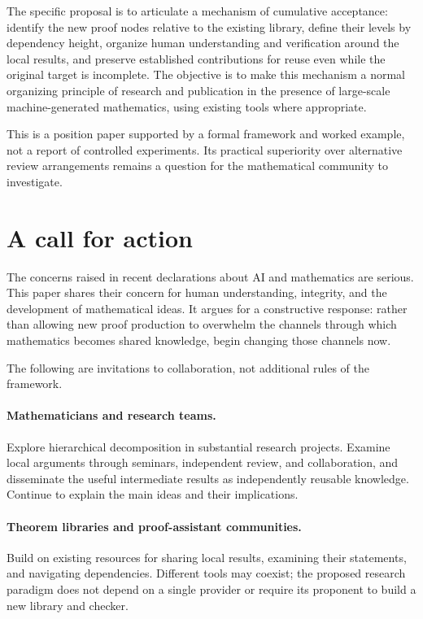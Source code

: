 \documentclass[11pt,a4paper]{article}
\theoremstyle{definition}\newtheorem{definition}{Definition}
\begin{document}
The specific proposal is to articulate a mechanism of cumulative acceptance: identify the new proof nodes relative to the existing library, define their levels by dependency height, organize human understanding and verification around the local results, and preserve established contributions for reuse even while the original target is incomplete. The objective is to make this mechanism a normal organizing principle of research and publication in the presence of large-scale machine-generated mathematics, using existing tools where appropriate.

This is a position paper supported by a formal framework and worked example, not a report of controlled experiments. Its practical superiority over alternative review arrangements remains a question for the mathematical community to investigate.

\section{A call for action}
The concerns raised in recent declarations about AI and mathematics are serious. This paper shares their concern for human understanding, integrity, and the development of mathematical ideas. It argues for a constructive response: rather than allowing new proof production to overwhelm the channels through which mathematics becomes shared knowledge, begin changing those channels now.

The following are invitations to collaboration, not additional rules of the framework.

\paragraph{Mathematicians and research teams.} Explore hierarchical decomposition in substantial research projects. Examine local arguments through seminars, independent review, and collaboration, and disseminate the useful intermediate results as independently reusable knowledge. Continue to explain the main ideas and their implications.

\paragraph{Theorem libraries and proof-assistant communities.} Build on existing resources for sharing local results, examining their statements, and navigating dependencies. Different tools may coexist; the proposed research paradigm does not depend on a single provider or require its proponent to build a new library and checker.
\end{document}
